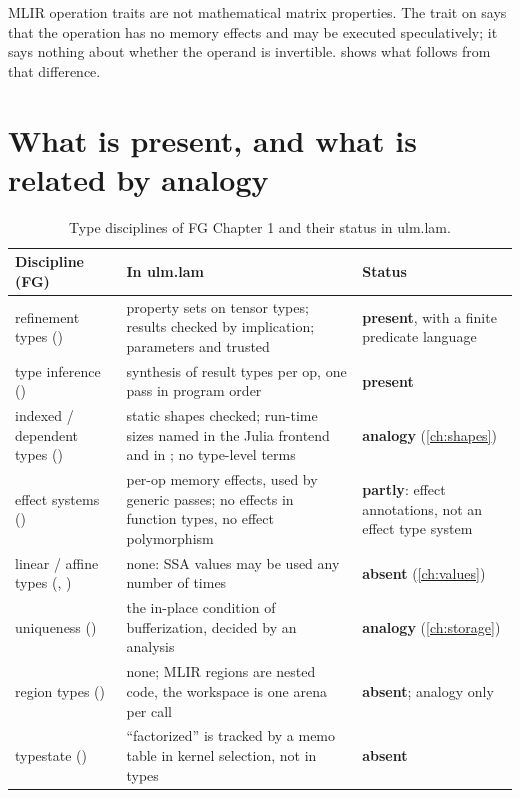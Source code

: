 \begin{limit}
MLIR operation traits are not mathematical matrix properties. The trait
 on  says that the operation has no memory
effects and may be executed speculatively; it says nothing about whether the
operand is invertible.  shows what follows
from that difference.
\end{limit}

\section{What is present, and what is related by analogy}
\label{sec:infra-analogy}

\begin{table}[t]
\centering\small
\begin{tabularx}{\linewidth}{@{}P{3.2cm}LP{2.4cm}@{}}
\toprule
\textbf{Discipline (FG)} & \textbf{In ulm.lam} & \textbf{Status} \\
\midrule
refinement types () & property sets on tensor types; results
  checked by implication; parameters and  trusted &
  \textbf{present}, with a finite predicate language \\
type inference () & synthesis of result types per op, one pass
  in program order & \textbf{present} \\
indexed / dependent types () & static shapes checked; run-time
  sizes named in the Julia frontend and in ; no
  type-level terms & \textbf{analogy} (\cref{ch:shapes}) \\
effect systems () & per-op memory effects, used by generic
  passes; no effects in function types, no effect polymorphism &
  \textbf{partly}: effect annotations, not an effect type system \\
linear / affine types (, ) & none: SSA values may be
  used any number of times & \textbf{absent} (\cref{ch:values}) \\
uniqueness () & the in-place condition of bufferization, decided
  by an analysis & \textbf{analogy} (\cref{ch:storage}) \\
region types () & none; MLIR regions are nested code, the
  workspace is one arena per call & \textbf{absent}; analogy only \\
typestate () & ``factorized'' is tracked by a memo table in
  kernel selection, not in types & \textbf{absent} \\
\bottomrule
\end{tabularx}
\caption{Type disciplines of FG Chapter 1 and their status in ulm.lam.}
\label{tab:infra-status}
\end{table}

